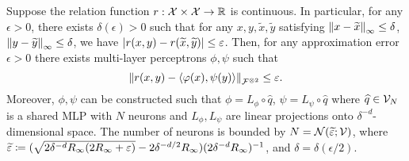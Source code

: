 \begin{theorem}
    Suppose the relation function $r: {\mathcal{X}} \times {\mathcal{X}} \to \mathbb{R}$ is continuous. In particular, for any $\epsilon > 0$, there exists $\delta(\epsilon) > 0$ such that for any $x, y, \tilde{x}, \tilde{y}$ satisfying $\left\lVert x - \widetilde{x}\right\rVert_{\infty} \leq \delta$, $\left\lVert y - \widetilde{y}\right\rVert_{\infty} \leq \delta$, we have $\left\lvert r(x, y) - r(\widetilde{x}, \widetilde{y})\right\rvert \leq \varepsilon$. Then, for any approximation error $\epsilon > 0$ there exists multi-layer perceptrons $\phi, \psi$ such that
    \begin{equation*}
        \norm{r(x,y) - \iprod{\phi(x)}{\psi(y)}}_{\calF^{\otimes 2}} \leq \epsilon.
    \end{equation*}
    Moreover, $\phi, \psi$ can be constructed such that $\phi = L_\phi \circ \hat{q}$, $\psi = L_\psi \circ \hat{q}$ where $\widehat{q} \in {\mathcal{V}}_N$ is a shared MLP with $N$ neurons and $L_\phi, L_\psi$ are linear projections onto $\delta^{-d}$-dimensional space. The number of neurons is bounded by $N = {\mathcal{N}}(\widetilde{\varepsilon}; {\mathcal{V}})$, where $\widetilde{\varepsilon} \coloneq (\sqrt{2 \delta^{-d} R_\infty (2 R_\infty + \varepsilon)} - 2 \delta^{-d / 2} R_\infty) (2 \delta^{-d} R_\infty)^{-1}$, and $\delta = \delta(\epsilon / 2)$.

\end{theorem}
